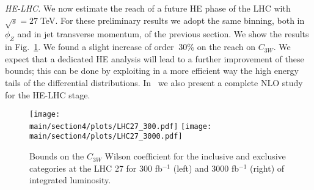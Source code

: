 \noindent
\emph{HE-LHC.}
We now estimate the reach of a future HE phase of the LHC with
$\sqrt{s}=27\;$TeV. For these preliminary results we adopt the same binning, both in $\phi_Z$ and in jet transverse momentum, of the previous section. We show the results in Fig.~\ref{fig:LHC27}. We found a slight increase of order $~30\%$ on the reach on $C_{3W}$. We expect that a dedicated HE analysis will lead to a further improvement of these bounds; this can be done by exploiting in a more efficient way the high energy tails of the differential distributions. In~\cite{Azatov:2019xxn} we also present a complete NLO study for the HE-LHC stage. 


  \begin{figure}[ht]
\begin{center}
 \texttt{[image: \\main/section4/plots/LHC27\_300.pdf]}{}\hspace{2cm}
 \texttt{[image: \\main/section4/plots/LHC27\_3000.pdf]}{}
\end{center}
\caption{Bounds on the $C_{3W}$ Wilson coefficient for the inclusive and exclusive categories at the LHC 27 for 300 fb$^{-1}$ (left) and 3000 fb$^{-1}$ (right) of integrated luminosity.}
\label{fig:LHC27}
\end{figure}


